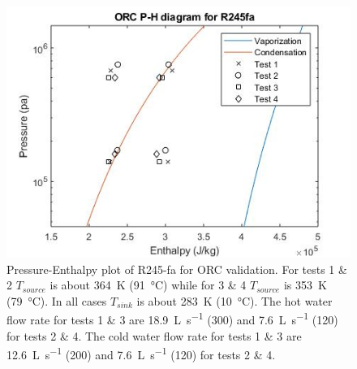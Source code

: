 \begin{figure}[p]
	\centering

	\includegraphics[width=\textwidth]{figures/VerificationPH01}

	\caption{Pressure-Enthalpy plot of R245-fa for ORC validation. 
	For tests 1 \& 2 $T_{source}$ is about \SI{364}{\kelvin} (\SI{91}{\degreeCelsius})
	while for 3 \& 4 $T_{source}$ is \SI{353}{\kelvin} (\SI{79}{\degreeCelsius}). 
	In all cases $T_{sink}$ is about \SI{283}{\kelvin} (\SI{10}{\degreeCelsius}). 
	The hot water flow rate for tests 1 \& 3 are \SI{18.9}{\liter\per\second} (\SI{300}{\gpm})
	and	\SI{7.6}{\liter\per\second} (\SI{120}{\gpm}) for tests 2 \& 4. 
	The cold water flow rate for tests 1 \& 3 are \SI{12.6}{\liter\per\second} (\SI{200}{\gpm})
	and \SI{7.6}{\liter\per\second} (\SI{120}{\gpm}) for tests 2 \& 4.}
	\label{fig:verifcation_ph01}
\end{figure}